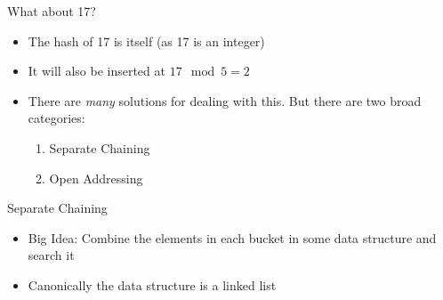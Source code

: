 \documentclass[12pt, aspectration=1610]{beamer}
\begin{document}
    \begin{frame}{What about 17?}
        \begin{itemize}
            \item The hash of 17 is itself (as 17 is an integer)
            \item It will also be inserted at $17 \mod 5 = 2$
            \item There are \textit{many} solutions for dealing with this. But there are two broad categories:
                \begin{enumerate}
                    \item Separate Chaining
                    \item Open Addressing
                \end{enumerate}
        \end{itemize}
    \end{frame}
    \begin{frame}{Separate Chaining}
        \begin{itemize}
            \item Big Idea: Combine the elements in each bucket in some data structure and search it
            \item Canonically the data structure is a linked list 
        \end{itemize}
    \end{frame}
\end{document}

